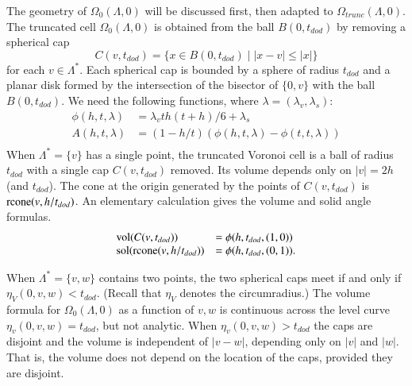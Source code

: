 \documentclass{article} %
\begin{document}
The geometry of $\Omega_0(\Lambda,0)$ will be discussed first,
then adapted to $\Omega_{trunc}(\Lambda,0)$.  The truncated cell
$\Omega_0(\Lambda,0)$ is obtained from the ball $B(0,t_{dod})$ by
removing a spherical cap
   $$
   C(v,t_{dod}) = \{x \in B(0,t_{dod}) \mid  |x - v| \le |x| \}
   $$
for each $v\in\Lambda^*$.
Each spherical cap is bounded by a sphere of radius $t_{dod}$ and
a planar disk formed by the intersection of the bisector of 
$\{0,v\}$ with the ball $B(0,t_{dod})$.
We need the following functions, where $\lambda=(\lambda_v,\lambda_s)$:
\begin{equation}
\begin{array}{lll}
\phi(h,t,\lambda) &= \lambda_v t h (t+h)/6 + \lambda_s\\
A(h,t,\lambda) &= (1-h/t)(\phi(h,t,\lambda)-\phi(t,t,\lambda))\\
\end{array}
\end{equation}
When $\Lambda^* = \{v\}$ has a single point, the truncated Voronoi
cell is a ball of radius $t_{dod}$
with a single cap $C(v,t_{dod})$ removed.  Its volume depends
only on $|v|=2h$ (and $t_{dod}$).  
The cone at the origin generated by the points of $C(v,t_{dod})$ is
${\operatorname{rcone}}(v,h/t_{dod})$.  An elementary calculation gives the volume and
solid angle formulas.
\begin{equation}  
\begin{array}{lll}
{\operatorname{vol}}(C(v,t_{dod})) &= \phi(h,t_{dod},(1,0)) \\
{\operatorname{sol}}({\operatorname{rcone}}(v,h/t_{dod})) &= \phi(h,t_{dod},(0,1)).\\
\end{array}
\end{equation}



When $\Lambda^*=\{v,w\}$ contains two points, the two spherical
caps meet if and only if $\eta_V(0,v,w) < t_{dod}$.  (Recall that
$\eta_V$ denotes the circumradius.)   The volume formula for
$\Omega_0(\Lambda,0)$ as a function of $v,w$ is continuous
across the level curve $\eta_v(0,v,w)=t_{dod}$, but not analytic.
When $\eta_v(0,v,w) > t_{dod}$ the caps are disjoint and the
volume is independent of $|v-w|$, depending only on $|v|$ and $|w|$.
That is, the volume does not depend on the location of the caps,
provided they are disjoint.
\end{document}

